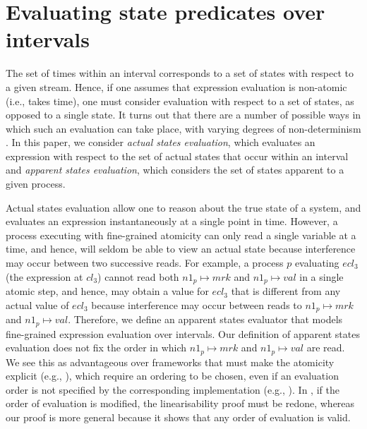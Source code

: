 \documentclass{article}
\theoremstyle{plain}
\theoremstyle{definition}
\begin{document}
\section{Evaluating state predicates over intervals}
\label{sec:eval-state-pred}

The set of times within an interval corresponds to a set of states
with respect to a given stream. Hence, if one assumes that expression
evaluation is non-atomic (i.e., takes time), one must consider
evaluation with respect to a set of states, as opposed to a single
state. It turns out that there are a number of possible ways in which
such an evaluation can take place, with varying degrees of
non-determinism \cite{HBDJ13}. In this paper, we consider \emph{actual
  states evaluation}, which evaluates an expression with respect to
the set of actual states that occur within an interval and
\emph{apparent states evaluation}, which considers the set of states
apparent to a given process.

Actual states evaluation allow one to reason about the true state of a
system, and evaluates an expression instantaneously at a single point
in time. However, a process executing with fine-grained atomicity can
only read a single variable at a time, and hence, will seldom be able
to view an actual state because interference may occur between two
successive reads. For example, a process $p$ evaluating $ecl_3$ (the
expression at $cl_3$) cannot read both $n1_p\mapsto mrk$ and
$n1_p\mapsto val$ in a single atomic step, and hence, may obtain a
value for $ecl_3$ that is different from any actual value of $ecl_3$
because interference may occur between reads to $n1_p\mapsto mrk$ and
$n1_p\mapsto val$. Therefore, we define an apparent states evaluator
that models fine-grained expression evaluation over intervals. Our
definition of apparent states evaluation does not fix the order in
which $n1_p\mapsto mrk$ and $n1_p\mapsto val$ are read. We see this as
advantageous over frameworks that must make the atomicity explicit
(e.g., \cite{VHHS06,CGLM06,DSW11}), which require an ordering to be
chosen, even if an evaluation order is not specified by the
corresponding implementation (e.g., \cite{HHLMSS07}). In
\cite{VHHS06,CGLM06,DSW11}, if the order of evaluation is modified,
the linearisability proof must be redone, whereas our proof is more
general because it shows that any order of evaluation is valid.
\end{document}
